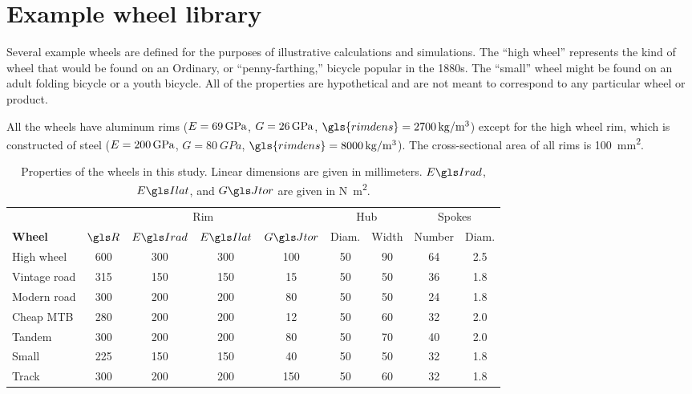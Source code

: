 \documentclass[../../thesis.tex]{subfiles}
\begin{document}
\section{Example wheel library}
\label{app:wheel_library}

Several example wheels are defined for the purposes of illustrative calculations and simulations. The ``high wheel'' represents the kind of wheel that would be found on an Ordinary, or ``penny-farthing,'' bicycle popular in the 1880s. The ``small'' wheel might be found on an adult folding bicycle or a youth bicycle. All of the properties are hypothetical and are not meant to correspond to any particular wheel or product.

All the wheels have aluminum rims ($E=\SI{69}{GPa}$, $G=\SI{26}{GPa}$, $\gls{rimdens}=\SI{2700}{kg/m^3}$) except for the high wheel rim, which is constructed of steel ($E=\SI{200}{GPa}$, $G=\SI{80}{GPa}$, $\gls{rimdens}=\SI{8000}{kg/m^3}$). The cross-sectional area of all rims is \SI{100}{mm^2}.

\begin{table}
\caption{Properties of the wheels in this study. Linear dimensions are given in millimeters. $\EIr$, $\EIl$, and $\GJ$ are given in \si{N.m^2}.}
\label{tab:example_wheel_props}
\begin{tabular}{l|cccc|cc|cc}
\hline
&\multicolumn{4}{c|}{Rim} & \multicolumn{2}{c|}{Hub} & \multicolumn{2}{c}{Spokes}\\
\bf{Wheel} & $\R$ & $\EIr$ & $\EIl$ & $\GJ$ & Diam. & Width & Number & Diam.\\
\hline
High wheel   & 600 & 300 & 300 & 100 & 50 & 90 & 64 & 2.5\\
Vintage road & 315 & 150 & 150 & 15  & 50 & 50 & 36 & 1.8\\
Modern road  & 300 & 200 & 200 & 80  & 50 & 50 & 24 & 1.8\\
Cheap MTB    & 280 & 200 & 200 & 12  & 50 & 60 & 32 & 2.0\\
Tandem       & 300 & 200 & 200 & 80  & 50 & 70 & 40 & 2.0\\
Small        & 225 & 150 & 150 & 40  & 50 & 50 & 32 & 1.8\\
Track        & 300 & 200 & 200 & 150 & 50 & 60 & 32 & 1.8\\
\hline
\end{tabular}
\end{table}
\end{document}
